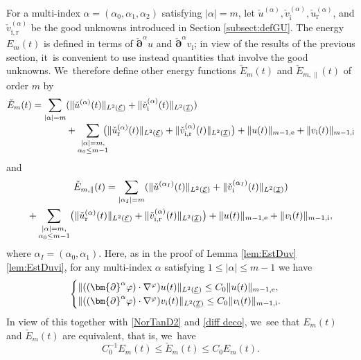 \documentclass[JEP,XML,SOM,Unicode,NoFloatCountersInSection,published]{cedram}
\newcommand{\cI}{{\mathcal I}}
\newcommand{\cE}{{\mathcal E}}
\newcommand{\ul}[1]{\underline{#1}}
\theoremstyle{definition}
\begin{document}
For a multi-index $\alpha=(\alpha_0,\alpha_1,\alpha_2)$ satisfying $|\alpha|=m$, let $\check{u}^{(\alpha)}, \check{v}_\mathrm{i}^{(\alpha)},
\check{u}_\mathrm{r}^{(\alpha)}$, and $\check{v}_\mathrm{i,r}^{(\alpha)}$ be the good unknowns introduced in Section \ref{subsect:defGU}.
The energy $E_{m}(t)$ is defined in terms of $\check{\bm{\partial}}^\alpha u$ and $\check{\bm{\partial}}^\alpha v_\mathrm{i}$;
in view of the results of the previous section, it~is convenient to use instead quantities that involve the good unknowns. We~therefore define other energy functions $\check{E}_m(t)$ and $\check{E}_{m,\parallel}(t)$ of order $m$ by
\begin{align*}
\check{E}_m(t)
= \sum_{|\alpha|=m}&(\|\check{u}^{(\alpha)}(t)\|_{L^2(\ul{\cE})} + \|\check{v}_\mathrm{i}^{(\alpha)}(t)\|_{L^2(\ul{\cI})}) \\[-3pt]
&+ \sum_{\substack{|\alpha|=m, \\ \alpha_0\leq m-1}}\hspace*{-2mm}\bigl(\|\check{u}_\mathrm{r}^{(\alpha)}(t)\|_{L^2(\ul{\cE})} + \|\check{v}_\mathrm{i,r}^{(\alpha)}(t)\|_{L^2(\ul{\cI})}\bigr)
+ \|u(t)\|_{m-1,{\rm e}} + \|v_\mathrm{i}(t)\|_{m-1,{\rm i}}
\end{align*}
and
\begin{multline*}
\check{E}_{m,\parallel}(t)
= \sum_{|\alpha_I|=m}(\|\check{u}^{(\alpha_I)}(t)\|_{L^2(\ul{\cE})} + \|\check{v}_\mathrm{i}^{(\alpha_I)}(t)\|_{L^2(\ul{\cI})}) \\
+ \sum_{\substack{|\alpha|=m,\\ \alpha_0\leq m-1}}\bigl(\|\check{u}_\mathrm{r}^{(\alpha)}(t)\|_{L^2(\ul{\cE})} + \|\check{v}_\mathrm{i,r}^{(\alpha)}(t)\|_{L^2(\ul{\cI})}\bigr)
+ \|u(t)\|_{m-1,{\rm e}} + \|v_\mathrm{i}(t)\|_{m-1,{\rm i}},
\end{multline*}
where $\alpha_I=(\alpha_0,\alpha_1)$.
Here, as in the proof of Lemma \ref{lem:EstDuv}\eqref{lem:EstDuvi}, for any multi-index $\alpha$ satisfying $1\leq|\alpha|\leq m-1$ we have
\[
\begin{cases}
\|((\bm{\partial}^\alpha\varphi)\cdot\nabla^\varphi)u(t)\|_{L^2(\ul{\cE})} \leq C_0\|u(t)\|_{m-1,{\rm e}}, \\
\|((\bm{\partial}^\alpha\varphi)\cdot\nabla^\varphi)v_\mathrm{i}(t)\|_{L^2(\ul{\cI})} \leq C_0\|v_\mathrm{i}(t)\|_{m-1,{\rm i}}.
\end{cases}
\]
In view of this together with \eqref{NorTanD2} and \eqref{diff deco}, we~see that $E_m(t)$ and $\check{E}_m(t)$ are equivalent, that is, we~have
\begin{equation}\label{eqEcEm}
C_0^{-1}E_m(t) \leq \check{E}_m(t) \leq C_0E_m(t).
\end{equation}
\end{document}
